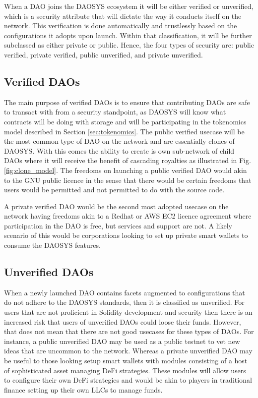 \documentclass[journal,twocolumn,12pt]{ieeesyscoin}
\begin{document}
When a DAO joins the DAOSYS ecosystem it will be either verified or unverified, which is a security attribute that will dictate the way it conducts itself on the network. This verification is done automatically and trustlessly based on the configurations it adopts upon launch. Within that classification, it will be further subclassed as either private or public. Hence, the four types of security are: public verified, private verified, public unverified, and private unverified.

\subsection{Verified DAOs}
\label{sec:verified}

The main purpose of verified DAOs is to ensure that contributing DAOs are safe to transact with from a security standpoint, as DAOSYS will know what contracts will be doing with storage and will be participating in the tokenomics model described in Section \ref{sec:tokenomics}. The public verified usecase will be the most common type of DAO on the network and are essentially clones of DAOSYS. With this comes the ability to create is own sub-network of child DAOs where it will receive the benefit of cascading royalties as illustrated in Fig. \ref{fig:clone_model}. The freedoms on launching a public verified DAO would akin to the GNU public licence in the sense that there would be certain freedoms that users would be permitted and not permitted to do with the source code.

A private verified DAO would be the second most adopted usecase on the network having freedoms akin to a Redhat or AWS EC2 licence agreement where participation in the DAO is free, but services and support are not. A likely scenario of this would be corporations looking to set up private smart wallets to consume the DAOSYS features.

\subsection{Unverified DAOs}
\label{sec:unverified}

When a newly launched DAO contains facets augmented to configurations that do not adhere to the DAOSYS standards, then it is classified as unverified. For users that are not proficient in Solidity development and security then there is an increased risk that users of unverified DAOs could loose their funds. However, that does not mean that there are not good usecases for these types of DAOs. For instance, a public unverified DAO may be used as a public testnet to vet new ideas that are uncommon to the network. Whereas a private unverified DAO may be useful to those looking setup smart wallets with modules consisting of a host of sophisticated asset managing DeFi strategies. These modules will allow users to configure their own DeFi strategies and would be akin to players in traditional finance setting up their own LLCs to manage funds.
\end{document}

